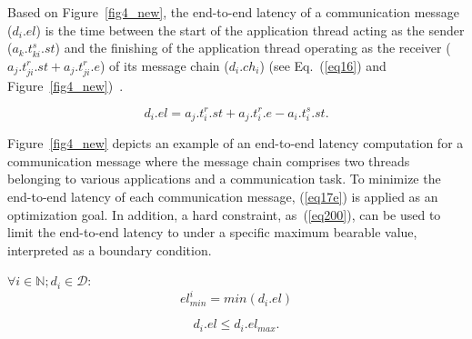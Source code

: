     Based on Figure~\ref{fig4_new}, the end-to-end latency of a communication message ($d_i.el$) is the time between the start of the application thread acting as the sender ($a_k.t_{ki}^{s}.st$) and the finishing of the application thread operating as the receiver ($a_j.t_{ji}^{r}.st + a_j.t_{ji}^{r}.e$) of its message chain ($d_i.ch_i$) (see Eq.~(\ref{eq16}) and Figure~\ref{fig4_new})~\cite{askaripoor2023designer}.
    
    
    \begin{equation}
    	d_i.el = a_j.t_i^{r}.st + a_j.t_i^{r}.e - a_i.t_i^{s}.st.
    	\label{eq16}
    \end{equation}\newline 
    

    Figure~\ref{fig4_new} depicts an example of an end-to-end latency computation for a communication message where the message chain comprises two threads belonging to various applications and a communication task. To minimize the end-to-end latency of each communication message, (\ref{eq17e}) is applied as an optimization goal. In addition, a hard constraint, as~(\ref{eq200}), can be used to limit the end-to-end latency to under a specific maximum bearable value, interpreted as a boundary condition.\newline

    $\forall i \in \mathbb{N}; d_i \in\mathcal{D}$:
    \begin{equation}
    	el^{i}_{min} = min ({d_i.el})  
    	\label{eq17e}
    \end{equation}
    
    \begin{equation}
	d_i.el \leq d_i.el_{max}.
	\label{eq200}
    \end{equation}
 
